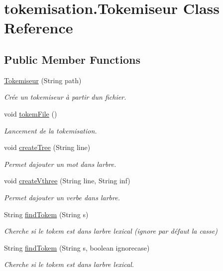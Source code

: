 \hypertarget{classtokemisation_1_1_tokemiseur}{}\section{tokemisation.\+Tokemiseur Class Reference}
\label{classtokemisation_1_1_tokemiseur}
\subsection*{Public Member Functions}
\begin{DoxyCompactItemize}
\item 
\hyperlink{classtokemisation_1_1_tokemiseur_a0bedd0f61434a9597b87c674a52af8bf}{Tokemiseur} (String path)
\begin{DoxyCompactList}\small\item\em Crée un tokemiseur à partir d\textquotesingle{}un fichier. \end{DoxyCompactList}\item 
void \hyperlink{classtokemisation_1_1_tokemiseur_a1036e3bd17f10ac37b00142119495307}{tokem\+File} ()\hypertarget{classtokemisation_1_1_tokemiseur_a1036e3bd17f10ac37b00142119495307}{}\label{classtokemisation_1_1_tokemiseur_a1036e3bd17f10ac37b00142119495307}

\begin{DoxyCompactList}\small\item\em Lancement de la tokemisation. \end{DoxyCompactList}\item 
void \hyperlink{classtokemisation_1_1_tokemiseur_a9af268b22fd743447b689a27e0b0db3a}{create\+Tree} (String line)
\begin{DoxyCompactList}\small\item\em Permet d\textquotesingle{}ajouter un mot dans l\textquotesingle{}arbre. \end{DoxyCompactList}\item 
void \hyperlink{classtokemisation_1_1_tokemiseur_ae932be66d27c705438bb7e07036c2f52}{create\+Vthree} (String line, String inf)
\begin{DoxyCompactList}\small\item\em Permet d\textquotesingle{}ajouter un verbe dans l\textquotesingle{}arbre. \end{DoxyCompactList}\item 
String \hyperlink{classtokemisation_1_1_tokemiseur_a9aa1bbf145517a2b9b79461d8d831145}{find\+Tokem} (String s)
\begin{DoxyCompactList}\small\item\em Cherche si le tokem est dans l\textquotesingle{}arbre lexical (ignore par défaut la casse) \end{DoxyCompactList}\item 
String \hyperlink{classtokemisation_1_1_tokemiseur_a38dda47926268cb3eb8ad66373755083}{find\+Tokem} (String s, boolean ignorecase)
\begin{DoxyCompactList}\small\item\em Cherche si le tokem est dans l\textquotesingle{}arbre lexical. \end{DoxyCompactList}\end{DoxyCompactItemize}


